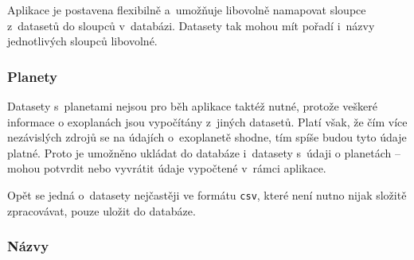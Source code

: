 \documentclass[a4paper,12pt]{article}
\def\code#1{\texttt{#1}}
\begin{document}
{{{{{{{{

Aplikace je postavena flexibilně a~umožňuje libovolně namapovat sloupce z~datasetů do sloupců v~databázi. Datasety tak mohou mít pořadí i~názvy jednotlivých sloupců libovolné.


\subsubsection{Planety}

Datasety s~planetami nejsou pro běh aplikace taktéž nutné, protože veškeré informace o exoplanách jsou vypočítány z~jiných datasetů. Platí však, že čím více nezávislých zdrojů se na údajích o~exoplanetě shodne, tím spíše budou tyto údaje platné. Proto je umožněno ukládat do databáze i~datasety s~údaji o planetách -- mohou potvrdit nebo vyvrátit údaje vypočtené v~rámci aplikace.


Opět se jedná o~datasety nejčastěji ve formátu \code{csv}, které není nutno nijak složitě zpracovávat, pouze uložit do databáze.


\subsubsection{Názvy}

}}}}}}}}
\end{document}
